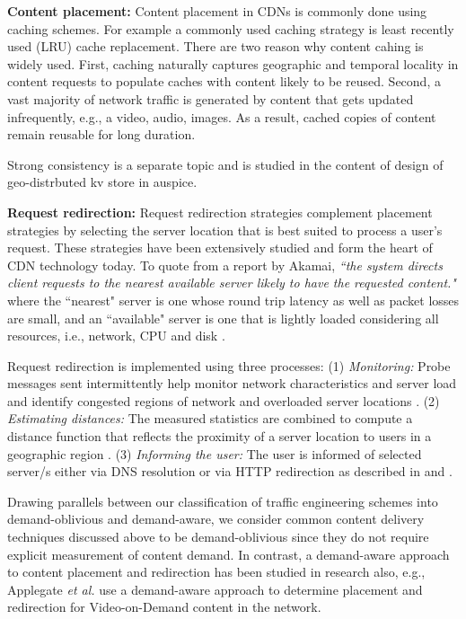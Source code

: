 \textbf{Content placement:} Content placement in CDNs is commonly done using caching schemes. For example a commonly used caching strategy is least recently used (LRU) cache replacement. There are two reason why content cahing is widely used. First, caching naturally captures geographic and temporal locality in content requests to populate caches with content likely to be reused. Second, a vast majority of network traffic is generated by content that gets updated infrequently, e.g., a video, audio, images. As a result, cached copies of content remain reusable for long duration. 



Strong consistency is a separate topic and is studied in the content of design of geo-distrbuted kv store in auspice.

\textbf{Request redirection:} Request redirection strategies complement placement strategies by selecting the server location that is best suited to process a user's request. These strategies have been extensively studied and form the heart of CDN technology today. To quote from a report by Akamai,  \emph{``the system directs client requests to the nearest available server likely to have the requested content."} where the ``nearest" server is one whose round trip latency as well as packet losses are small, and  an ``available" server is one that is lightly loaded considering all resources, i.e., network, CPU and disk  \cite{DilleyMPPSW02}. 

Request redirection is implemented using three processes: (1) \emph{Monitoring:} Probe messages sent intermittently help monitor network characteristics and server load and identify congested regions of network and overloaded server locations \cite{oasis,donar}. (2) \emph{Estimating distances:} The measured statistics are combined to compute a distance function that reflects the proximity of a server location to users in a geographic region \cite{donar}. (3) \emph{Informing the user:} The user is informed of selected server/s either via DNS resolution or via HTTP redirection as described in  \cite{DilleyMPPSW02} and  \cite{barbir2003known}.


Drawing parallels between our classification of traffic engineering schemes into demand-oblivious and demand-aware, we consider common content delivery techniques discussed above to be demand-oblivious since they do not require explicit measurement of content demand. In contrast, a demand-aware approach to content placement and redirection has been studied in research also, e.g., Applegate \emph{et al.} use a demand-aware approach to determine placement and redirection for Video-on-Demand content in the network. 


